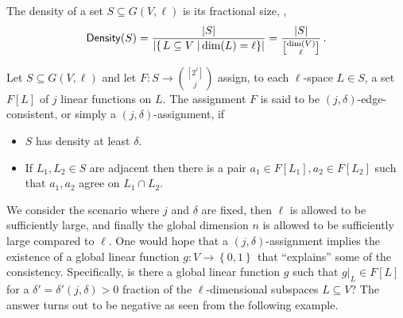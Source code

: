 \documentclass{toc}
\newcommand\card[1]{\left| {#1} \right|}
\newcommand\sett[2]{\left\{ \left. #1 \;\right\vert #2 \right\}}
\newcommand\set[1]{{\left\{ #1 \right\}}}
\newcommand\power[1]{\set{0,1}^{#1}}
\begin{document}
\begin{definition}
The density of a set $S\subseteq G(V,\ell)$ is its fractional size, \ie,
\[
{\sf Density}(S)= \frac{|S|}{\card{\sett{L\subseteq V}{\dim (L) = \ell}}} = \frac{\card{S}}{{\dim(V) \brack \ell}}\,.%
\]
\end{definition}

\begin{definition}\label{def:edge_consistent} Let $S\subseteq G(V,\ell)$ and let $F: S \to {[2^\ell] \choose j}$
 assign, to each $\ell$-space  $L \in S$, a set  $F[L]$ of $j$ linear functions on $L$. The assignment $F$ is
 said to be $(j,\delta)$-edge-consistent, or simply a $(j,\delta)$-assignment, if
 \begin{itemize}
 \item $S$ has density at least $\delta$.
 \item If $L_1,L_2\in S$ are %
adjacent  %
then
there is a pair $a_1\in F[L_1],a_2\in F[L_2]$ such that $a_1,a_2$ agree on $L_1\cap L_2$.
\end{itemize}
\end{definition}

We consider the scenario where $j$ and $\delta$ are fixed,
%
 then $\ell$ is allowed to be
sufficiently large, and finally
the global dimension $n$ is allowed to be sufficiently large compared to $\ell$.
One would hope that a $(j,\delta)$-assignment implies the existence of
a global linear function $g\colon V\to\power{}$ that ``explains'' some of the consistency.
Specifically, is there a global linear function $g$ such that $g|_L \in F[L]$ for
 a %
$\delta' = \delta'(j,
\delta)>0$ fraction of the $\ell$-dimensional subspaces $L\subseteq V$? The answer turns out to be negative as seen from the following example.
\end{document}
